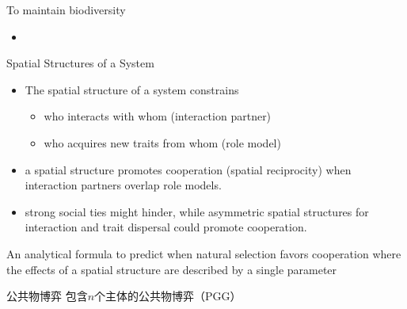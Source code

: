 \begin{frame}{To maintain biodiversity}
    \begin{itemize}
    	\item 
    \end{itemize}
\end{frame}

\begin{frame}{Spatial Structures of a System}
	\begin{itemize}
		\item The spatial structure of a system constrains 
		\begin{itemize}
			\item who interacts with whom (interaction partner) 
			\item who acquires new traits from whom (role model)
		\end{itemize}
		\item a spatial structure promotes cooperation (spatial reciprocity) when interaction partners overlap role models.
		\item strong social ties might hinder, while asymmetric spatial structures for interaction and trait dispersal could promote cooperation.
	\end{itemize}
 An analytical formula to predict when natural selection favors cooperation where the effects of a spatial structure are described by a single parameter
\end{frame}

\begin{frame}{公共物博弈}
	包含$n$个主体的公共物博弈（PGG）
\end{frame}